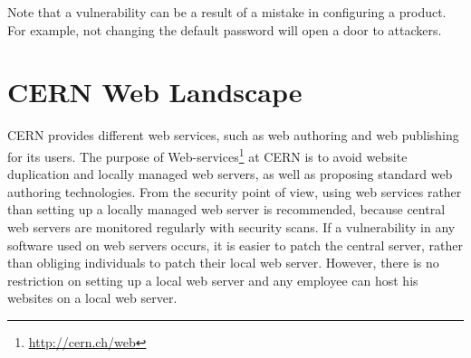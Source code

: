 Note that a vulnerability can be a result of a mistake in configuring a product. For example, not changing the default password will open a door to attackers. 

\section{CERN Web Landscape}

CERN provides different web services, such as web authoring and web publishing for its users. The purpose of Web-services\footnote{\url{http://cern.ch/web}} at CERN is to avoid website duplication and locally managed web servers, as well as proposing standard web authoring technologies. From the security point of view, using web services rather than setting up a locally managed web server is recommended, because central web servers are monitored regularly with security scans. If a vulnerability in any software used on web servers occurs, it is easier to patch the central server, rather than obliging individuals to patch their local web server. However, there is no restriction on setting up a local web server and any employee can host his websites on a local web server. 

